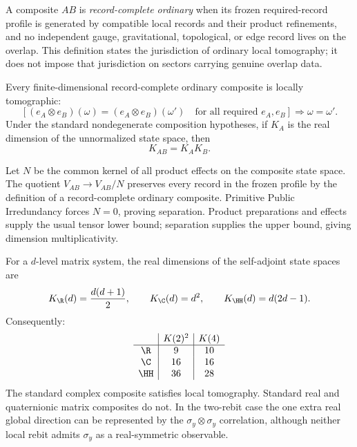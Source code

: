 \begin{definition}
A composite \(AB\) is \emph{record-complete ordinary} when its frozen required-record
profile is generated by compatible local records and their product refinements,
and no independent gauge, gravitational, topological, or edge record lives on the
overlap.  This definition states the jurisdiction of ordinary local tomography; it
does not impose that jurisdiction on sectors carrying genuine overlap data.
\end{definition}

\begin{theorem}
\label{thm:ppi-local-tomography}
Every finite-dimensional record-complete ordinary composite is locally tomographic:
\[
 \left[
 (e_A\otimes e_B)(\omega)
 =
 (e_A\otimes e_B)(\omega')
 \quad\text{for all required }e_A,e_B
 \right]
 \Longrightarrow
 \omega=\omega'.
\]
Under the standard nondegenerate composition hypotheses, if \(K_A\) is the real
dimension of the unnormalized state space, then
\[
  K_{AB}=K_AK_B.
\]
\end{theorem}

\begin{proofsketch}
Let \(N\) be the common kernel of all product effects on the composite state space.
The quotient \(V_{AB}\to V_{AB}/N\) preserves every record in the frozen profile by
the definition of a record-complete ordinary composite.  Primitive Public
Irredundancy forces \(N=0\), proving separation.  Product preparations and effects
supply the usual tensor lower bound; separation supplies the upper bound, giving
dimension multiplicativity.
\end{proofsketch}

\begin{proposition}
\label{prop:scalar-field-diagnostic}
For a \(d\)-level matrix system, the real dimensions of the self-adjoint state spaces
are
\[
 K_{\R}(d)=\frac{d(d+1)}2,
 \qquad
 K_{\C}(d)=d^2,
 \qquad
 K_{\HH}(d)=d(2d-1).
\]
Consequently:
\[
\begin{array}{c|c|c}
 & K(2)^2 & K(4)\\
\hline
\R & 9 & 10\\
\C & 16 & 16\\
\HH & 36 & 28
\end{array}
\]
The standard complex composite satisfies local tomography.  Standard real and
quaternionic matrix composites do not.  In the two-rebit case the one extra real
global direction can be represented by the
\(\sigma_y\otimes\sigma_y\) correlation, although neither local rebit admits
\(\sigma_y\) as a real-symmetric observable.
\end{proposition}

